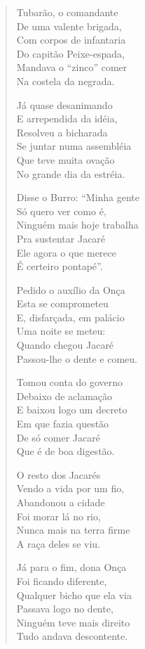 \begin{verse}
Tubarão, o comandante\\
De uma valente brigada,\\
Com corpos de infantaria\\
Do capitão Peixe-espada,\\
Mandava o “zinco” comer\\
Na costela da negrada.

Já quase desanimando\\
E arrependida da idéia,\\
Resolveu a bicharada\\
Se juntar numa assembléia\\
Que teve muita ovação\\
No grande dia da estréia.

Disse o Burro: “Minha gente\\
Só quero ver como é,\\
Ninguém mais hoje trabalha\\
Pra sustentar Jacaré\\
Ele agora o que merece\\
É certeiro pontapé”.

Pedido o auxílio da Onça\\
Esta se comprometeu\\
E, disfarçada, em palácio\\
Uma noite se meteu:\\
Quando chegou Jacaré\\
Passou-lhe o dente e comeu.
\pagebreak

Tomou conta do governo\\
Debaixo de aclamação\\
E baixou logo um decreto\\
Em que fazia questão\\
De só comer Jacaré\\
Que é de boa digestão.

O resto dos Jacarés\\
Vendo a vida por um fio,\\
Abandonou a cidade\\
Foi morar lá no rio,\\
Nunca mais na terra firme\\
A raça deles se viu.

Já para o fim, dona Onça\\
Foi ficando diferente,\\
Qualquer bicho que ela via\\
Passava logo no dente,\\
Ninguém teve mais direito\\
Tudo andava descontente.


\end{verse}
